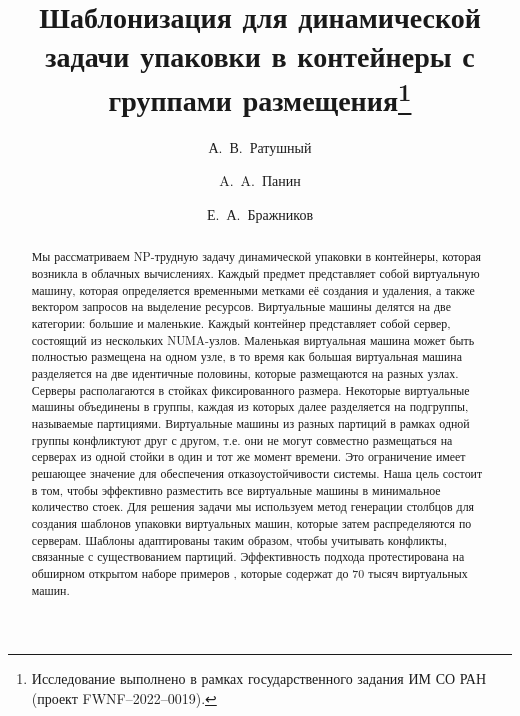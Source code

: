 \documentclass[12pt]{llncs}
\begin{document}
\fi

\title{Шаблонизация для динамической задачи упаковки в контейнеры с группами размещения\thanks{Исследование выполнено в рамках государственного задания ИМ СО РАН (проект FWNF–2022–0019).}}

\author{
А.~В.~Ратушный \and A.~A.~Панин  \and Е.~А.~Бражников
}



\maketitle

\begin{abstract}

Мы рассматриваем NP-трудную задачу динамической упаковки в контейнеры, которая возникла в облачных вычислениях.
Каждый предмет представляет собой виртуальную машину, которая определяется временными метками её создания и удаления, а также вектором запросов на выделение ресурсов.
Виртуальные машины делятся на две категории: большие и маленькие.
Каждый контейнер представляет собой сервер, состоящий из нескольких NUMA-узлов.
Маленькая виртуальная машина может быть полностью размещена на одном узле, в то время как большая виртуальная машина разделяется на две идентичные половины, которые размещаются на разных узлах.
Серверы располагаются в стойках фиксированного размера.
Некоторые виртуальные машины объединены в группы, каждая из которых далее разделяется на подгруппы, называемые партициями.
Виртуальные машины из разных партиций в рамках одной группы конфликтуют друг с другом, т.е. они не могут совместно размещаться на серверах из одной стойки в один и тот же момент времени.
Это ограничение имеет решающее значение для обеспечения отказоустойчивости системы.
Наша цель состоит в том, чтобы эффективно разместить все виртуальные машины в минимальное количество стоек.
Для решения задачи мы используем метод генерации столбцов для создания шаблонов упаковки виртуальных машин, которые затем распределяются по серверам.
Шаблоны адаптированы таким образом, чтобы учитывать конфликты, связанные с существованием партиций.
Эффективность подхода протестирована на обширном открытом наборе примеров \cite{benchmark}, которые содержат до 70 тысяч виртуальных машин.

\end{abstract}
\end{document}
